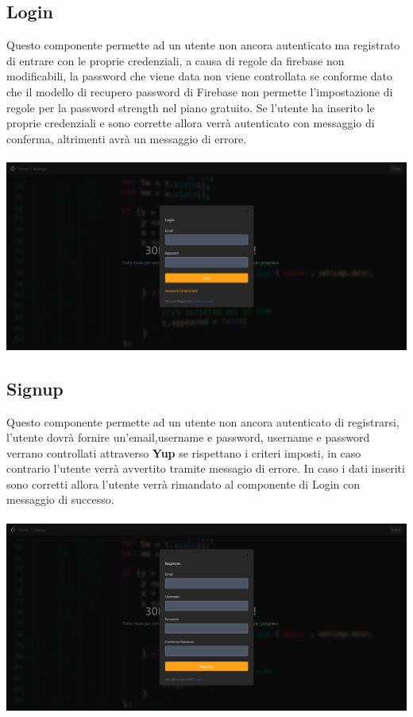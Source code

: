 \documentclass[11pt, a4paper]{article}
\theoremstyle{definition}
\begin{document}
\subsection{Login}
Questo componente permette ad un utente non ancora autenticato ma registrato di entrare con le proprie credenziali, a causa di regole da firebase non modificabili, la password che viene data non viene controllata se conforme dato che il modello
di recupero password di Firebase non permette l'impostazione di regole per la password strength nel piano gratuito.
Se l'utente ha inserito le proprie credenziali e sono corrette allora verrà autenticato con messaggio di conferma, altrimenti avrà un messaggio di errore.\\\\
\includegraphics[width=\textwidth]{materiale/sito/Login.png}
\newpage
\subsection{Signup}
Questo componente permette ad un utente non ancora autenticato di registrarsi, l'utente dovrà fornire un'email,username e password, username e password verrano controllati attraverso \textbf{Yup} se rispettano i criteri imposti, in caso contrario l'utente verrà avvertito tramite messagio di errore.
In caso i dati inseriti sono corretti allora l'utente verrà rimandato al componente di Login con messaggio di successo.\\\\
\includegraphics[width=\textwidth]{materiale/sito/Signup.png}
\newpage
\end{document}
